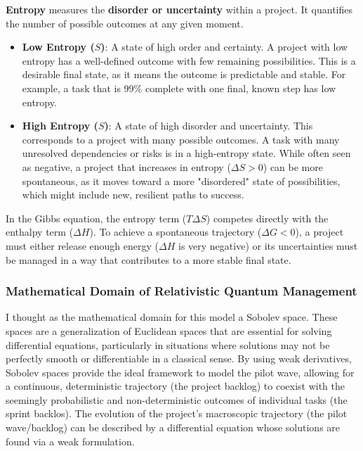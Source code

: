 \documentclass{article}
\begin{document}
\textbf{Entropy} measures the \textbf{disorder or uncertainty} within a project. It quantifies the number of possible outcomes at any given moment.

\begin{itemize}
    \item \textbf{Low Entropy ($S$)}: A state of high order and certainty. A project with low entropy has a well-defined outcome with few remaining possibilities. This is a desirable final state, as it means the outcome is predictable and stable. For example, a task that is 99\% complete with one final, known step has low entropy.
    \item \textbf{High Entropy ($S$)}: A state of high disorder and uncertainty. This corresponds to a project with many possible outcomes. A task with many unresolved dependencies or risks is in a high-entropy state. While often seen as negative, a project that increases in entropy ($\Delta S > 0$) can be more spontaneous, as it moves toward a more "disordered" state of possibilities, which might include new, resilient paths to success.
\end{itemize}

In the Gibbs equation, the entropy term ($T\Delta S$) competes directly with the enthalpy term ($\Delta H$). To achieve a spontaneous trajectory ($\Delta G < 0$), a project must either release enough energy ($\Delta H$ is very negative) or its uncertainties must be managed in a way that contributes to a more stable final state.

\subsubsection*{Mathematical Domain of Relativistic Quantum Management}
I thought as the mathematical domain for this model a Sobolev space. These spaces are a generalization of Euclidean spaces that are essential for solving differential equations, particularly in situations where solutions may not be perfectly smooth or differentiable in a classical sense. By using weak derivatives, Sobolev spaces provide the ideal framework to model the pilot wave, allowing for a continuous, deterministic trajectory (the project backlog) to coexist with the seemingly probabilistic and non-deterministic outcomes of individual tasks (the sprint backlos). The evolution of the project's macroscopic trajectory (the pilot wave/backlog) can be described by a differential equation whose solutions are found via a weak formulation. 
\end{document}

